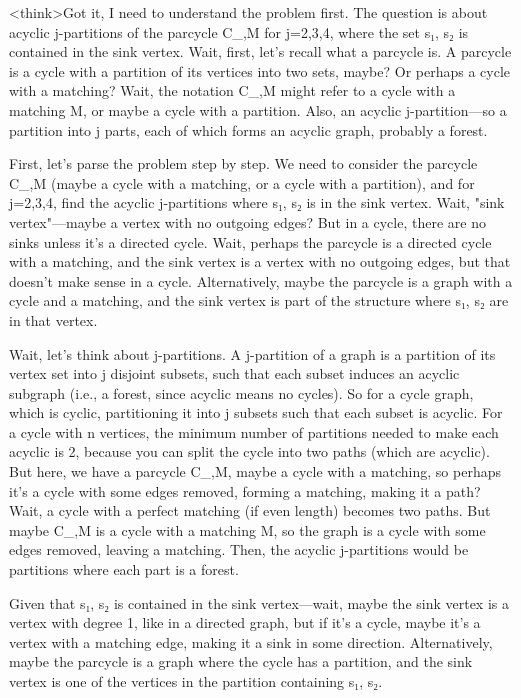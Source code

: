 <think>Got it, I need to understand the problem first. The question is about acyclic j-partitions of the parcycle C_{,M} for j=2,3,4, where the set {s₁, s₂} is contained in the sink vertex. Wait, first, let's recall what a parcycle is. A parcycle is a cycle with a partition of its vertices into two sets, maybe? Or perhaps a cycle with a matching? Wait, the notation C_{,M} might refer to a cycle with a matching M, or maybe a cycle with a partition. Also, an acyclic j-partition—so a partition into j parts, each of which forms an acyclic graph, probably a forest. 

First, let's parse the problem step by step. We need to consider the parcycle C_{,M} (maybe a cycle with a matching, or a cycle with a partition), and for j=2,3,4, find the acyclic j-partitions where {s₁, s₂} is in the sink vertex. Wait, "sink vertex"—maybe a vertex with no outgoing edges? But in a cycle, there are no sinks unless it's a directed cycle. Wait, perhaps the parcycle is a directed cycle with a matching, and the sink vertex is a vertex with no outgoing edges, but that doesn't make sense in a cycle. Alternatively, maybe the parcycle is a graph with a cycle and a matching, and the sink vertex is part of the structure where {s₁, s₂} are in that vertex. 

Wait, let's think about j-partitions. A j-partition of a graph is a partition of its vertex set into j disjoint subsets, such that each subset induces an acyclic subgraph (i.e., a forest, since acyclic means no cycles). So for a cycle graph, which is cyclic, partitioning it into j subsets such that each subset is acyclic. For a cycle with n vertices, the minimum number of partitions needed to make each acyclic is 2, because you can split the cycle into two paths (which are acyclic). But here, we have a parcycle C_{,M}, maybe a cycle with a matching, so perhaps it's a cycle with some edges removed, forming a matching, making it a path? Wait, a cycle with a perfect matching (if even length) becomes two paths. But maybe C_{,M} is a cycle with a matching M, so the graph is a cycle with some edges removed, leaving a matching. Then, the acyclic j-partitions would be partitions where each part is a forest. 

Given that {s₁, s₂} is contained in the sink vertex—wait, maybe the sink vertex is a vertex with degree 1, like in a directed graph, but if it's a cycle, maybe it's a vertex with a matching edge, making it a sink in some direction. Alternatively, maybe the parcycle is a graph where the cycle has a partition, and the sink vertex is one of the vertices in the partition containing {s₁, s₂}. 

